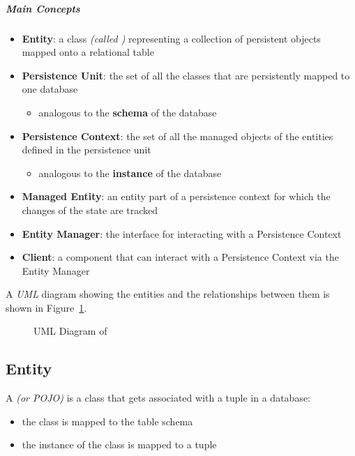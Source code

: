 \documentclass[english]{article}
\begin{document}
\subparagraph*{\jpa Main Concepts}

\begin{itemize}
  \item \textbf{Entity}: a \java class \textit{(called \javab)} representing a collection of persistent objects mapped onto a relational table
  \item \textbf{Persistence Unit}: the set of all the classes that are persistently mapped to one database
        \begin{itemize}[label=\(\rightarrow\)]
          \item analogous to the \textbf{schema} of the database
        \end{itemize}
  \item \textbf{Persistence Context}: the set of all the managed objects of the entities defined in the persistence unit
        \begin{itemize}[label=\(\rightarrow\)]
          \item analogous to the \textbf{instance} of the database
        \end{itemize}
  \item \textbf{Managed Entity}: an entity part of a persistence context for which the changes of the state are tracked
  \item \textbf{Entity Manager}: the interface for interacting with a Persistence Context
  \item \textbf{Client}: a component that can interact with a Persistence Context via the Entity Manager
\end{itemize}

A \textit{UML} diagram showing the entities and the relationships between them is shown in Figure~\ref{fig:uml-diagram-jpa}.

\begin{figure}[htbp]
  \centering
  \caption{UML Diagram of \jpa}
  \label{fig:uml-diagram-jpa}
\end{figure}

\subsection{Entity}

A \javab \textit{(or POJO)} is a \java class that gets associated with a tuple in a database:

\begin{itemize}
  \item the class is mapped to the table schema
  \item the instance of the class is mapped to a tuple
\end{itemize}
\end{document}

